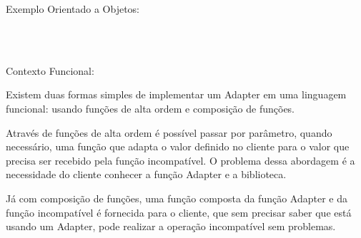 Exemplo Orientado a Objetos:

\begin{lstlisting}[caption={Adapter Orientado a Objetos},label=ooadapter]



\end{lstlisting}

Contexto Funcional:

Existem duas formas simples de implementar um Adapter em uma linguagem 
funcional: usando funções de alta ordem e composição de funções.

Através de funções de alta ordem é possível passar por parâmetro, 
quando necessário, uma função que adapta o valor definido no cliente 
para o valor que precisa ser recebido pela função incompatível. O 
problema dessa abordagem é a necessidade do cliente conhecer a função 
Adapter e a biblioteca.

Já com composição de funções, uma função composta da função Adapter 
e da função incompatível é fornecida para o cliente, que sem precisar 
saber que está usando um Adapter, pode realizar a operação incompatível 
sem problemas.

\begin{lstlisting}[caption={Adapter Funcional},label=fpadapter]
    

    
\end{lstlisting}